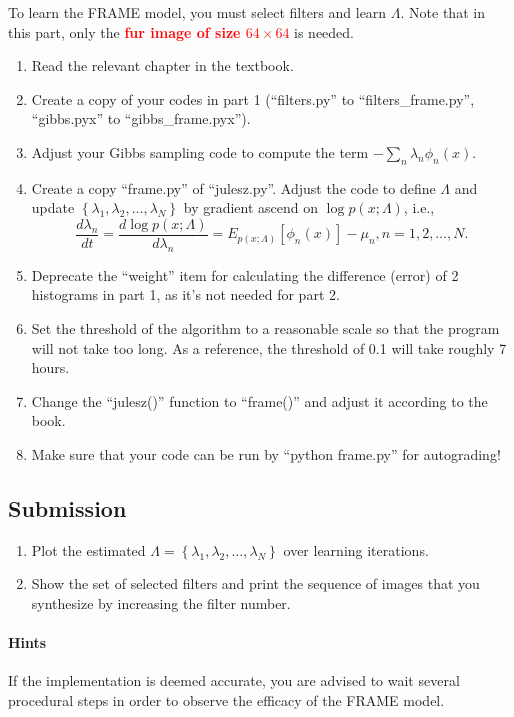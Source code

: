 \documentclass[11pt]{article}
\begin{document}
To learn the FRAME model, you must select filters and learn $\Lambda$. Note that in this part, only the \textbf{\textcolor{red}{fur image of size $64 \times 64$}} is needed.
\begin{enumerate}
    \item Read the relevant chapter in the textbook.
    \item Create a copy of your codes in part 1 (``filters.py'' to ``filters\_frame.py'', ``gibbs.pyx'' to ``gibbs\_frame.pyx'').
    \item  Adjust your Gibbs sampling code to compute the term $-\sum _{n}\lambda _{n}\phi _{n}(x)$.
    \item Create a copy ``frame.py'' of ``julesz.py''. Adjust the code to define $\Lambda $ and update $\left\{\lambda _{1},\lambda _{2},\ldots ,\lambda _{N}\right\}$ by gradient ascend on $\log p(x;\Lambda )$, i.e., 
    \begin{equation*}
        \frac{d\lambda _{n}}{dt}=\frac{d\log p(x;\Lambda ) }{d\lambda _{n}}=E_{p\left(x;\Lambda \right)}\left[\phi _{n}\left(x\right)\right]-\mu _{n} , n=1,2,\ldots ,N.
    \end{equation*}
    \item Deprecate the ``weight'' item for calculating the difference (error) of 2 histograms in part 1, as it's not needed for part 2.
    \item Set the threshold of the algorithm to a reasonable scale so that the program will not take too long. As a reference, the threshold of 0.1 will take roughly 7 hours.
    \item Change the ``julesz()'' function to ``frame()'' and adjust it according to the book.
    \item Make sure that your code can be run by ``python frame.py'' for autograding!
\end{enumerate}

\subsection{Submission}

\begin{enumerate}
    \item Plot the estimated $\Lambda =\left\{\lambda _{1},\lambda _{2},\ldots ,\lambda _{N}\right\}$ over learning iterations.
    \item Show the set of selected filters and print the sequence of images that you synthesize by increasing the filter number. 
\end{enumerate}

\paragraph{Hints}

If the implementation is deemed accurate, you  are advised to wait several procedural steps in order to observe the efficacy of the FRAME model.
\end{document}
